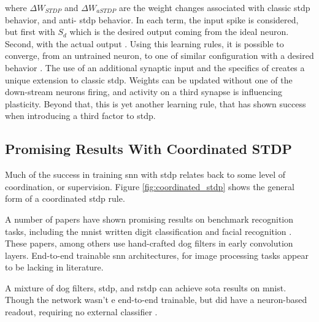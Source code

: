     \noindent where $\Delta W_{STDP}$ and $\Delta W_{aSTDP}$ are the weight
    changes associated with classic \gls{stdp} behavior, and anti- \gls{stdp}
    behavior. In each term, the input spike is considered, but first with
    $S_{d}$ which is the desired output coming from the ideal neuron. Second,
    with the actual output \parencite{mozafari_2018}. Using this learning rules,
    it is possible to converge, from an untrained neuron, to one of similar
    configuration with a desired behavior \parencite{ponulak_2010}. The use of
    an additional synaptic input and the specifics of 
    creates a unique extension to classic \gls{stdp}. Weights can be updated
    without one of the down-stream neurons firing, and activity on a third
    synapse is influencing plasticity. Beyond that, this is yet another learning
    rule, that has shown success when introducing a third factor to \gls{stdp}.



    \subsection{Promising Results With Coordinated STDP}
    Much of the success in training \gls{snn} with \gls{stdp} relates back to
    some level of coordination, or supervision. Figure
    \ref{fig:coordinated_stdp} shows the general form of a coordinated
    \gls{stdp} rule.

    
    A number of papers have shown promising results on benchmark recognition
    tasks, including the \gls{mnist} written digit classification
    \parencite{mozafari_2018} and facial recognition
    \parencite{delorme_2001}. These papers, among others use hand-crafted
    \gls{dog} filters in early convolution layers. End-to-end trainable
    \gls{snn} architectures, for image processing tasks appear to be lacking in
    literature.
    
    A mixture of \gls{dog} filters, \gls{stdp}, and \gls{rstdp} can achieve
    \acrshort{sota} results on \gls{mnist}. Though the network wasn't e end-to-end
    trainable, but did have a neuron-based readout, requiring no external
    classifier \parencite{mozafari_2018}.
    

